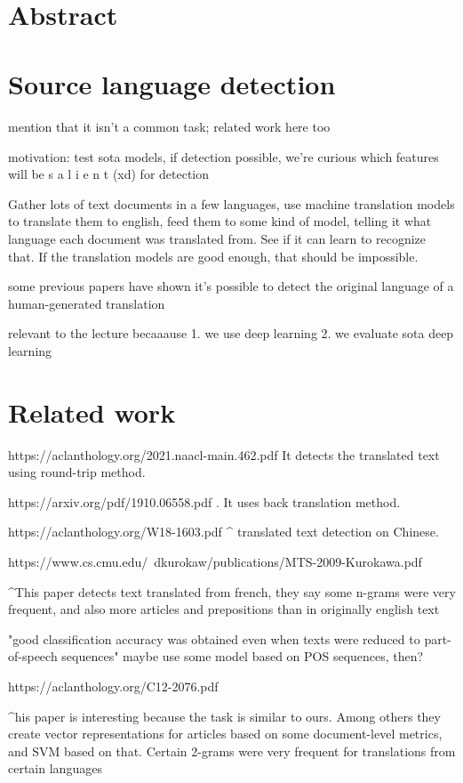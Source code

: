 \documentclass[twocolumn]{article}
\title{{\Huge \textbf{}} \\ }
\author{ \\ {\small }}
\date{}
\begin{document}
\section*{Abstract}

\section*{Source language detection}

mention that it isn't a common task; related work here too

motivation: test sota models, if detection possible, we're curious which features will be  s a l i e n t  (xd) for detection

Gather lots of text documents in a few languages, use machine translation models to translate them to english, feed them to some kind of model, telling it what language each document was translated from. See if it can learn to recognize that. If the translation models are good enough, that should be impossible.

some previous papers have shown it’s possible to detect the original language of a human-generated translation

relevant to the lecture becaaause 1. we use deep learning 2. we evaluate sota deep learning

\section*{Related work}

https://aclanthology.org/2021.naacl-main.462.pdf 
 It detects the translated text using round-trip method. 


https://arxiv.org/pdf/1910.06558.pdf
. It uses back translation method. 


https://aclanthology.org/W18-1603.pdf
^ translated text detection on Chinese. 


https://www.cs.cmu.edu/~dkurokaw/publications/MTS-2009-Kurokawa.pdf

^This paper detects text translated from french, they say some n-grams were very frequent, and also more articles and prepositions than in originally english text

"good classification accuracy was obtained even when texts were reduced to part-of-speech sequences"  maybe use some model based on POS sequences, then?


https://aclanthology.org/C12-2076.pdf

^his paper is interesting because the task is similar to ours. Among others they create vector representations for articles based on some document-level metrics, and SVM based on that. Certain 2-grams were very frequent for translations from certain languages
\end{document}
